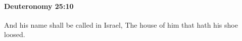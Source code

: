 
		\paragraph{Deuteronomy 25:10} %
			\label{DEUTERONOMY-25-10}

			And his name shall be called in Israel, The house of him that hath his shoe loosed.


